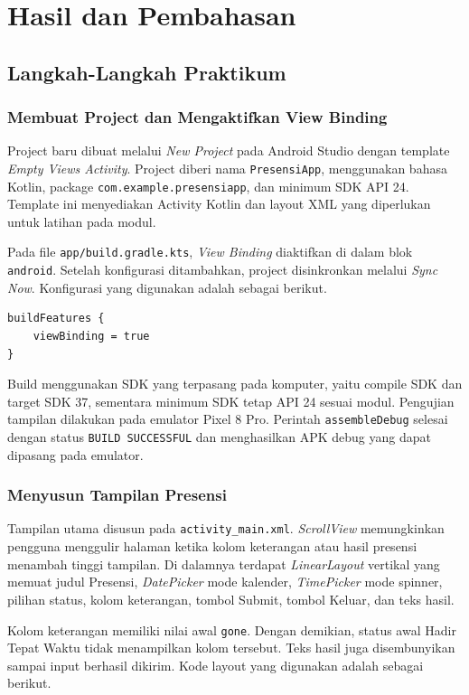 \documentclass[a4paper,oneside,11pt]{book}
\begin{document}
\chapter{Hasil dan Pembahasan}
\section{Langkah-Langkah Praktikum}
\subsection{Membuat Project dan Mengaktifkan View Binding}
Project baru dibuat melalui \textit{New Project} pada Android Studio dengan template \textit{Empty Views Activity}. Project diberi nama \texttt{PresensiApp}, menggunakan bahasa Kotlin, package \texttt{com.example.presensiapp}, dan minimum SDK API 24. Template ini menyediakan Activity Kotlin dan layout XML yang diperlukan untuk latihan pada modul.

Pada file \texttt{app/build.gradle.kts}, \textit{View Binding} diaktifkan di dalam blok \texttt{android}. Setelah konfigurasi ditambahkan, project disinkronkan melalui \textit{Sync Now}. Konfigurasi yang digunakan adalah sebagai berikut.
\begin{lstlisting}[style=kotlinstyle]
buildFeatures {
    viewBinding = true
}
\end{lstlisting}
Build menggunakan SDK yang terpasang pada komputer, yaitu compile SDK dan target SDK 37, sementara minimum SDK tetap API 24 sesuai modul. Pengujian tampilan dilakukan pada emulator Pixel 8 Pro. Perintah \texttt{assembleDebug} selesai dengan status \texttt{BUILD SUCCESSFUL} dan menghasilkan APK debug yang dapat dipasang pada emulator.

\subsection{Menyusun Tampilan Presensi}
Tampilan utama disusun pada \texttt{activity\_main.xml}. \textit{ScrollView} memungkinkan pengguna menggulir halaman ketika kolom keterangan atau hasil presensi menambah tinggi tampilan. Di dalamnya terdapat \textit{LinearLayout} vertikal yang memuat judul Presensi, \textit{DatePicker} mode kalender, \textit{TimePicker} mode spinner, pilihan status, kolom keterangan, tombol Submit, tombol Keluar, dan teks hasil.

Kolom keterangan memiliki nilai awal \texttt{gone}. Dengan demikian, status awal Hadir Tepat Waktu tidak menampilkan kolom tersebut. Teks hasil juga disembunyikan sampai input berhasil dikirim. Kode layout yang digunakan adalah sebagai berikut.

\end{document}
